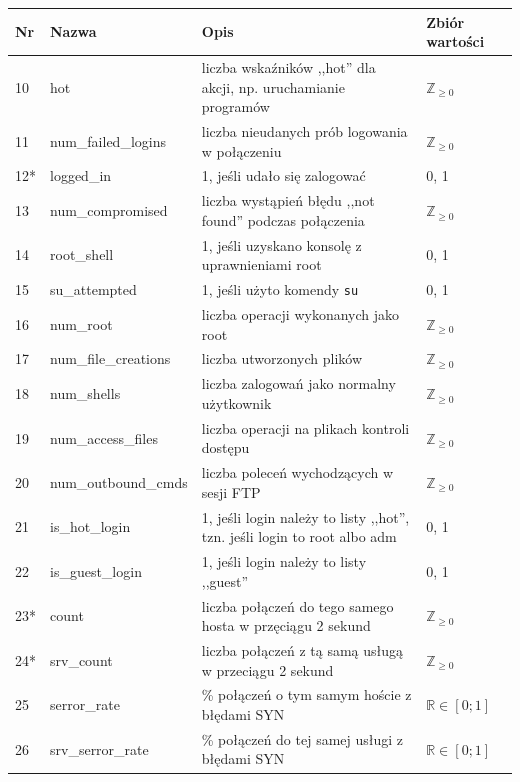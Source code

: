 \documentclass[a4paper, 12pt]{article}
\begin{document}
\begin{tabular}{ | l | l | p{6cm} | p{} | } \hline
Nr & Nazwa & Opis & Zbiór wartości \\ \hline
10      & hot & liczba wskaźników ,,hot'' dla akcji, np. uruchamianie programów & $\mathbb Z_{\ge 0}$ \\ \hline
11      & num\_failed\_logins  & liczba nieudanych prób logowania w połączeniu & $\mathbb Z_{\ge 0}$ \\ \hline
12*      & logged\_in  & 1, jeśli udało się zalogować &  0, 1 \\ \hline
13      & num\_compromised & liczba wystąpień błędu ,,not found'' podczas połączenia &  $\mathbb Z_{\ge 0}$ \\ \hline
14      & root\_shell  & 1, jeśli uzyskano konsolę z uprawnieniami root  &  0, 1 \\ \hline
15      & su\_attempted  & 1, jeśli użyto komendy \texttt{su} &  0, 1 \\ \hline
16      & num\_root  & liczba operacji wykonanych jako root  & $\mathbb Z_{\ge 0}$ \\ \hline
17      & num\_file\_creations  & liczba utworzonych plików  & $\mathbb Z_{\ge 0}$ \\ \hline
18      & num\_shells  & liczba zalogowań jako normalny użytkownik & $\mathbb Z_{\ge 0}$ \\ \hline
19      & num\_access\_files  & liczba operacji na plikach kontroli dostępu & $\mathbb Z_{\ge 0}$ \\ \hline
20      & num\_outbound\_cmds & liczba poleceń wychodzących w sesji FTP & $\mathbb Z_{\ge 0}$ \\ \hline
21      & is\_hot\_login  & 1, jeśli login należy to listy ,,hot'', tzn. jeśli login to root albo adm &  0, 1 \\ \hline
22      & is\_guest\_login  & 1, jeśli login należy to listy ,,guest'' &  0, 1 \\ \hline
23*     & count & liczba połączeń do tego samego hosta w przęciągu 2 sekund & $\mathbb Z_{\ge 0}$ \\ \hline
24*      & srv\_count   & liczba połączeń z tą samą usługą w przeciągu 2 sekund &  $\mathbb Z_{\ge 0}$ \\ \hline
25      & serror\_rate        & \% połączeń o tym samym hoście z błędami SYN  & $\mathbb{R} \in [0; 1]$ \\ \hline
26      & srv\_serror\_rate   & \% połączeń do tej samej usługi z błędami SYN & $\mathbb{R} \in [0; 1]$ \\ \hline

\end{tabular}
\end{document}
